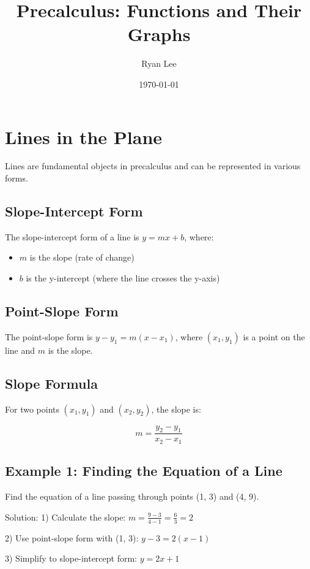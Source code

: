\documentclass[12pt]{article}
\title{Precalculus: Functions and Their Graphs}
\author{Ryan Lee}
\date{\today}
\begin{document}
\maketitle

\section{Lines in the Plane}

Lines are fundamental objects in precalculus and can be represented in various forms.

\subsection{Slope-Intercept Form}

The slope-intercept form of a line is $y = mx + b$, where:
\begin{itemize}
    \item $m$ is the slope (rate of change)
    \item $b$ is the y-intercept (where the line crosses the y-axis)
\end{itemize}

\subsection{Point-Slope Form}

The point-slope form is $y - y_1 = m(x - x_1)$, where $(x_1, y_1)$ is a point on the line and $m$ is the slope.

\subsection{Slope Formula}

For two points $(x_1, y_1)$ and $(x_2, y_2)$, the slope is:

\[m = \frac{y_2 - y_1}{x_2 - x_1}\]

\subsection{Example 1: Finding the Equation of a Line}

Find the equation of a line passing through points (1, 3) and (4, 9).

Solution:
1) Calculate the slope:
   $m = \frac{9 - 3}{4 - 1} = \frac{6}{3} = 2$
   
2) Use point-slope form with (1, 3):
   $y - 3 = 2(x - 1)$
   
3) Simplify to slope-intercept form:
   $y = 2x + 1$
\end{document}
